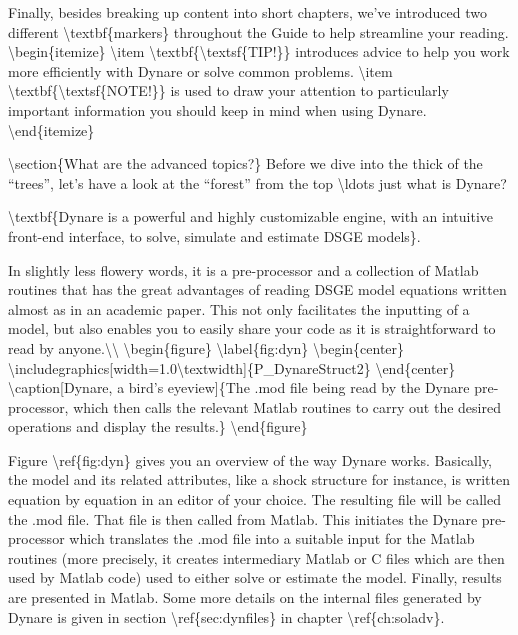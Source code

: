 \documentclass[10pt,math=newtx,citestyle=gb7714-2015,bibstyle=gb7714-2015]{elegantbook}
\begin{document}
	Finally, besides breaking up content into short chapters, we've introduced two different \textbackslash{}textbf\{markers\} throughout the Guide to help streamline your reading.
	\textbackslash{}begin\{itemize\}
	\textbackslash{}item \textbackslash{}textbf\{\textbackslash{}textsf\{TIP!\}\} introduces advice to help you work more efficiently with Dynare or solve common problems.
	\textbackslash{}item \textbackslash{}textbf\{\textbackslash{}textsf\{NOTE!\}\} is used to draw your attention to particularly important information you should keep in mind when using Dynare.
	\textbackslash{}end\{itemize\}
	
	
	\textbackslash{}section\{What are the advanced topics?\}
	Before we dive into the thick of the ``trees'', let's have a look at the ``forest'' from the top \textbackslash{}ldots just what is Dynare? 
	
	\textbackslash{}textbf\{Dynare is a powerful and highly customizable engine, with an intuitive front-end interface, to solve, simulate and estimate DSGE models\}. 
	
	In slightly less flowery words, it is a pre-processor and a collection of Matlab routines that has the great advantages of reading DSGE model equations written almost as in an academic paper. This not only facilitates the inputting of a model, but also enables you to easily share your code as it is straightforward to read by anyone.\textbackslash{}\textbackslash{}
	\textbackslash{}begin\{figure\} \textbackslash{}label\{fig:dyn\}
	\textbackslash{}begin\{center\}
	\textbackslash{}includegraphics[width=1.0\textbackslash{}textwidth]\{P\_DynareStruct2\}
	\textbackslash{}end\{center\}
	\textbackslash{}caption[Dynare, a bird's eyeview]\{The .mod file being read by the Dynare pre-processor, which then calls the relevant Matlab routines to carry out the desired operations and display the results.\}
	\textbackslash{}end\{figure\}
	
	Figure \textbackslash{}ref\{fig:dyn\} gives you an overview of the way Dynare works. Basically, the model and its related attributes, like a shock structure for instance, is written equation by equation in an editor of your choice. The resulting file will be called the .mod file. That file is then called from Matlab. This initiates the Dynare pre-processor which translates the .mod file into a suitable input for the Matlab routines (more precisely, it creates intermediary Matlab or C files which are then used by Matlab code) used to either solve or estimate the model. Finally, results are presented in Matlab. Some more details on the internal files generated by Dynare is given in section \textbackslash{}ref\{sec:dynfiles\} in chapter \textbackslash{}ref\{ch:soladv\}. 
	
\end{document}
